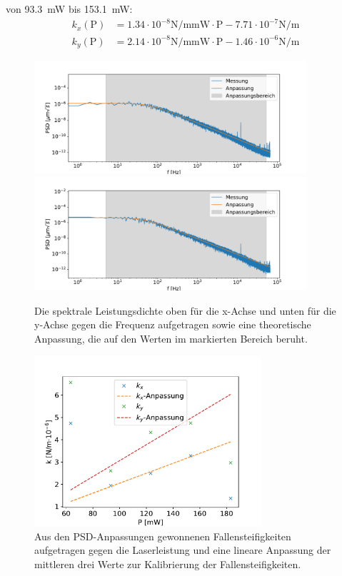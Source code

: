             von \SI{93.3}{\milli\watt} bis \SI{153.1}{\milli\watt}:
            \begin{align}
                k_x(\text{P}) &= 1.34\cdot10^{-8}\si{\newton\per\metre\milli\watt} \cdot \text{P} - 7.71\cdot10^{-7}\si{\newton\per\metre} \\
                k_y(\text{P}) &= 2.14\cdot10^{-8}\si{\newton\per\metre\milli\watt} \cdot \text{P} - 1.46\cdot10^{-6}\si{\newton\per\metre}
            \end{align}
            \begin{figure}[h]
            \centering
            \includegraphics[width = 0.9\textwidth]{freq_x.pdf}
            \includegraphics[width = 0.9\textwidth]{freq_y.pdf}
            \caption{Die spektrale Leistungsdichte oben für die x-Achse und unten für die y-Achse gegen die Frequenz aufgetragen sowie eine theoretische Anpassung, die auf den Werten im markierten Bereich beruht.}
            \label{fig:freq_noForce}
            \end{figure}
            \FloatBarrier
            \begin{figure}[h]
            \centering
            \includegraphics[width = 0.75\textwidth]{k_noForce.pdf}
            \caption{Aus den PSD-Anpassungen gewonnenen Fallensteifigkeiten aufgetragen gegen die Laserleistung und eine lineare Anpassung der mittleren drei Werte zur Kalibrierung der Fallensteifigkeiten.}
            \label{fig:k_noForce}
            \end{figure}
